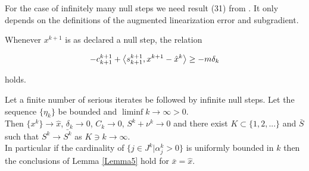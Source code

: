 
For the case of infinitely many null steps we need result (31) from \cite{Hare2016}. It only depends on the definitions of the augmented linearization error and subgradient.

Whenever \(x^{k+1}\) is as declared a null step, the relation 

\begin{equation}
	-c^{k+1}_{k+1} + \left\langle s^{k+1}_{k+1}, x^{k+1}-\hat{x}^k\right\rangle \geq -m\delta_k
\label{no_ls}
\end{equation}

holds.

\begin{theorem} 
	Let a finite number of serious iterates be followed by infinite null steps. Let the sequence \(\{\eta_k\}\) be bounded and \(\liminf k \to \infty > 0\). \\
	Then \(\{x^k\} \to \hat{x}\), \(\delta_k \to 0\), \(C_k \to 0\), \(S^k + \nu^k \to 0\) and there exist \(K\subset \{1,2,...\}\) and \(\bar{S}\) such that \(S^k \to \bar{S^k}\) as \(K \ni k \to \infty\). \\
	In particular if the cardinality of \(\{j \in J^k|\alpha_j^k > 0 \}\) is uniformly bounded in \(k\) then the conclusions of Lemma \ref{Lemma5} hold for \(\bar{x} = \hat{x}\). 
\end{theorem}

